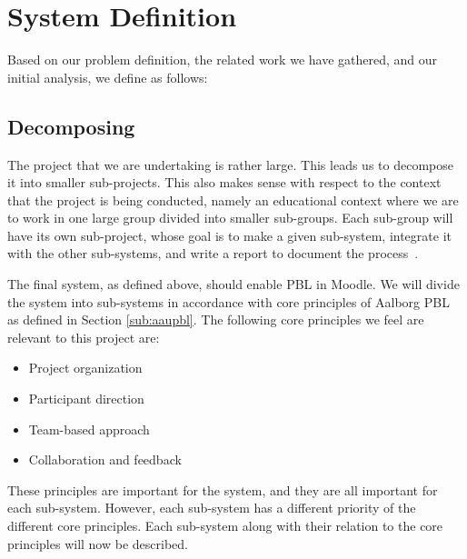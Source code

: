 \chapter{System Definition}
\label{sec:systemDef}
\label{chap:systemDef}
Based on our problem definition, the related work we have gathered, and our initial analysis, we define \system{} as follows:


\section{Decomposing \system}
\label{sub:decomposingSys}
The project that we are undertaking is rather large.
This leads us to decompose it into smaller sub-projects.
This also makes sense with respect to the context that the project is being conducted, namely an educational context where we are to work in one large group divided into smaller sub-groups. 
Each sub-group will have its own sub-project, whose goal is to make a given sub-system, integrate it with the other sub-systems, and write a report to document the process~\cite{sw6studieordning}.

The final system, as defined above, should enable PBL in Moodle.
We will divide the system into sub-systems in accordance with core principles of Aalborg PBL as defined in Section \ref{sub:aaupbl}.
The following core principles we feel are relevant to this project are:

\begin{itemize}
	\item Project organization
  \item Participant direction
  \item Team-based approach
  \item Collaboration and feedback
\end{itemize}

These principles are important for the system, and they are all important for each sub-system.
However, each sub-system has a different priority of the different core principles.
Each sub-system along with their relation to the core principles will now be described.


